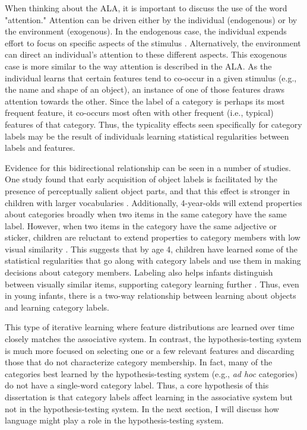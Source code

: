 \documentclass[../dissertation.tex]{subfiles}
\begin{document}
	When thinking about the ALA, it is important to discuss the use of the word "attention." Attention can be driven either by the individual (endogenous) or by the environment (exogenous). In the endogenous case, the individual expends effort to focus on specific aspects of the stimulus \citep{Engle2004}. Alternatively, the environment can direct an individual's attention to these different aspects. This exogenous case is more similar to the way attention is described in the ALA. As the individual learns that certain features tend to co-occur in a given stimulus (e.g., the name and shape of an object), an instance of one of those features draws attention towards the other. Since the label of a category is perhaps its most frequent feature, it co-occurs most often with other frequent (i.e., typical) features of that category. Thus, the typicality effects seen specifically for category labels may be the result of individuals learning statistical regularities between labels and features. \par
	Evidence for this bidirectional relationship can be seen in a number of studies. One study found that early acquisition of object labels is facilitated by the presence of perceptually salient object parts, and that this effect is stronger in children with larger vocabularies \citep{Poulin-Dubois1995}. Additionally, 4-year-olds will extend properties about categories broadly when two items in the same category have the same label. However, when two items in the category have the same adjective or sticker, children are reluctant to extend properties to category members with low visual similarity \citep{Graham2012}. This suggests that by age 4, children have learned some of the statistical regularities that go along with category labels and use them in making decisions about category members. Labeling also helps infants distinguish between visually similar items, supporting category learning further \citep{Switzer2017, Pickron2018}. Thus, even in young infants, there is a two-way relationship between learning about objects and learning category labels. \par
	This type of iterative learning where feature distributions are learned over time closely matches the associative system. In contrast, the hypothesis-testing system is much more focused on selecting one or a few relevant features and discarding those that do not characterize category membership. In fact, many of the categories best learned by the hypothesis-testing system (e.g., \textit{ad hoc} categories) do not have a single-word category label. Thus, a core hypothesis of this dissertation is that category labels affect learning in the associative system but not in the hypothesis-testing system. In the next section, I will discuss how language might play a role in the hypothesis-testing system. 
	
\end{document}
